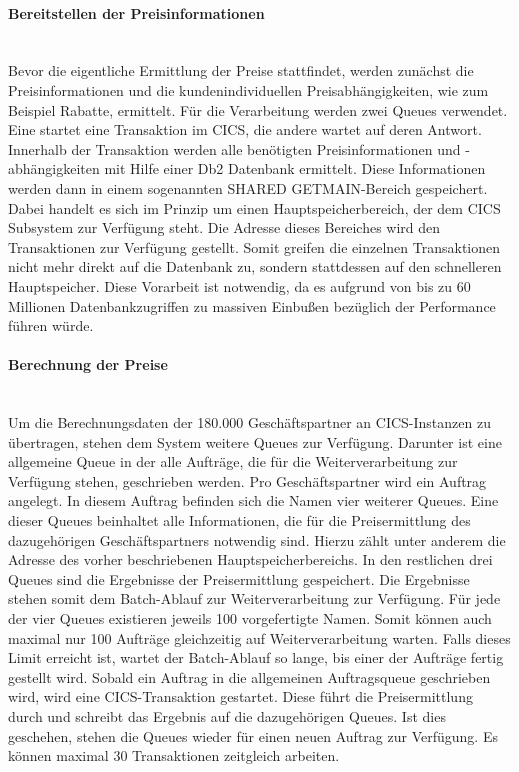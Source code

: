 \paragraph{Bereitstellen der Preisinformationen}~\\
Bevor die eigentliche Ermittlung der Preise stattfindet, werden zunächst die Preisinformationen und die kundenindividuellen Preisabhängigkeiten, wie zum Beispiel Rabatte, ermittelt.
Für die Verarbeitung werden zwei Queues verwendet.
Eine startet eine Transaktion im CICS, die andere wartet auf deren Antwort.
Innerhalb der Transaktion werden alle benötigten Preisinformationen und -abhängigkeiten mit Hilfe einer Db2 Datenbank ermittelt.
Diese Informationen werden dann in einem sogenannten \glqq SHARED GETMAIN\grqq-Bereich gespeichert.
Dabei handelt es sich im Prinzip um einen Hauptspeicherbereich, der dem CICS Subsystem zur Verfügung steht.
Die Adresse dieses Bereiches wird den Transaktionen zur Verfügung gestellt.
Somit greifen die einzelnen Transaktionen nicht mehr direkt auf die Datenbank zu, sondern stattdessen auf den schnelleren Hauptspeicher.
Diese Vorarbeit ist notwendig, da es aufgrund von bis zu 60 Millionen Datenbankzugriffen zu massiven Einbußen bezüglich der Performance führen würde.

\paragraph{Berechnung der Preise}~\\
Um die Berechnungsdaten der 180.000 Geschäftspartner an CICS-Instanzen zu übertragen, stehen dem System weitere Queues zur Verfügung.
Darunter ist eine allgemeine Queue in der alle Aufträge, die für die Weiterverarbeitung zur Verfügung stehen, geschrieben werden.
Pro Geschäftspartner wird ein Auftrag angelegt.
In diesem Auftrag befinden sich die Namen vier weiterer Queues.
Eine dieser Queues beinhaltet alle Informationen, die für die Preisermittlung des dazugehörigen Geschäftspartners notwendig sind.
Hierzu zählt unter anderem die Adresse des vorher beschriebenen Hauptspeicherbereichs.
In den restlichen drei Queues sind die Ergebnisse der Preisermittlung gespeichert.
Die Ergebnisse stehen somit dem Batch-Ablauf zur Weiterverarbeitung zur Verfügung.
Für jede der vier Queues existieren jeweils 100 vorgefertigte Namen.
Somit können auch maximal nur 100 Aufträge gleichzeitig auf Weiterverarbeitung warten.
Falls dieses Limit erreicht ist, wartet der Batch-Ablauf so lange, bis einer der Aufträge fertig gestellt wird.
Sobald ein Auftrag in die allgemeinen Auftragsqueue geschrieben wird, wird eine CICS-Transaktion gestartet.
Diese führt die Preisermittlung durch und schreibt das Ergebnis auf die dazugehörigen Queues.
Ist dies geschehen, stehen die Queues wieder für einen neuen Auftrag zur Verfügung.
Es können maximal 30 Transaktionen zeitgleich arbeiten.
